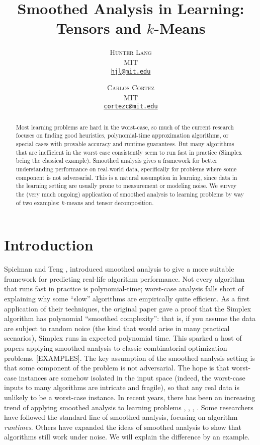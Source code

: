\documentclass[11pt]{article}
\title{\vspace{-5mm}\fontsize{22pt}{10pt}\selectfont Smoothed Analysis in Learning: Tensors and $k$-Means}
\author{
\large
\textsc{Hunter Lang} \\
\normalsize MIT \\
\normalsize \href{mailto:hjl@mit.edu}{\texttt{hjl@mit.edu}}\\
\and
\textsc{Carlos Cortez} \\
\normalsize MIT \\
\normalsize \href{mailto:cortezc@mit.edu}{\texttt{cortezc@mit.edu}}\\
\vspace{-5mm}
}
\date{}
\theoremstyle{definition}
\begin{document}
\maketitle


\begin{abstract}
\noindent Most learning problems are hard in the worst-case, so much
of the current research focuses on finding good heuristics,
polynomial-time approximation algorithms, or special cases with
provable accuracy and runtime guarantees. But many algorithms that are
inefficient in the worst case consistently seem to run fast in
practice (Simplex being the classical example). Smoothed analysis
gives a framework for better understanding performance on real-world
data, specifically for problems where some component is not
adversarial. This is a natural assumption in learning, since data in
the learning setting are usually prone to measurement or modeling
noise. We survey the (very much ongoing) application of smoothed
analysis to learning problems by way of two examples: $k$-means and
tensor decomposition.
\end{abstract}

\section{Introduction}
Spielman and Teng \cite{SA}, \cite{SAtwo} introduced smoothed analysis
to give a more suitable framework for predicting real-life algorithm
performance. Not every algorithm that runs fast in practice is
polynomial-time; worst-case analysis falls short of explaining why
some ``slow'' algorithms are empirically quite efficient. As a first
application of their techniques, the original paper \cite{SA} gave a
proof that the Simplex algorithm has polynomial ``smoothed
complexity'': that is, if you assume the data are subject to random
noice (the kind that would arise in many practical scenarios), Simplex
runs in expected polynomial time. This sparked a host of papers
applying smoothed analysis to classic combinatorial optimization
problems. [EXAMPLES]. The key assumption of the smoothed analysis
setting is that some component of the problem is not adversarial. The
hope is that worst-case instances are somehow isolated in the input
space (indeed, the worst-case inputs to many algorithms are intricate
and fragile), so that any real data is unlikely to be a worst-case
instance. In recent years, there has been an increasing trend of
applying smoothed analysis to learning problems \cite{SAtwo},
\cite{SAkmeans}, \cite{PAC}, \cite{TD}. Some researchers have followed
the standard line of smoothed analysis, focusing on algorithm
\emph{runtimes}. Others have expanded the ideas of smoothed analysis
to show that algorithms still work under noise. We will explain the
difference by an example.
\end{document}
